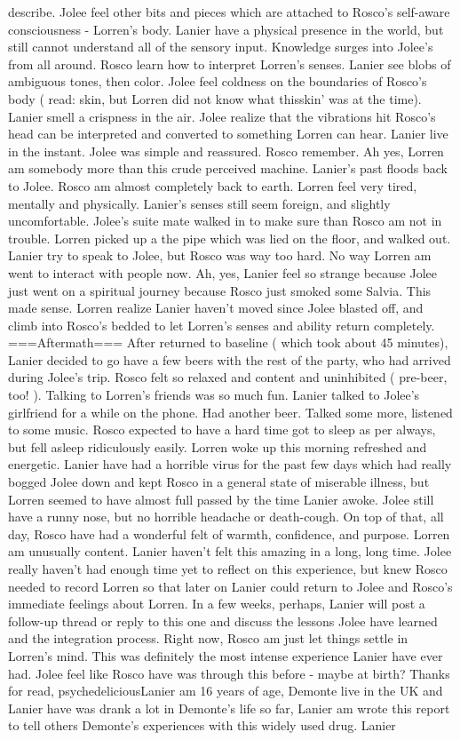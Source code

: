 \documentclass[12pt]{book}
\begin{document}
describe. Jolee feel other bits and pieces which are attached to Rosco's self-aware consciousness - Lorren's body. Lanier have a physical presence in the world, but still cannot understand all of the sensory input. Knowledge surges into Jolee's from all around. Rosco learn how to interpret Lorren's senses. Lanier see blobs of ambiguous tones, then color. Jolee feel coldness on the boundaries of Rosco's body ( read: skin, but Lorren did not know what thisskin' was at the time). Lanier smell a crispness in the air. Jolee realize that the vibrations hit Rosco's head can be interpreted and converted to something Lorren can hear. Lanier live in the instant. Jolee was simple and reassured. Rosco remember. Ah yes, Lorren am somebody more than this crude perceived machine. Lanier's past floods back to Jolee. Rosco am almost completely back to earth. Lorren feel very tired, mentally and physically. Lanier's senses still seem foreign, and slightly uncomfortable. Jolee's suite mate walked in to make sure than Rosco am not in trouble. Lorren picked up a the pipe which was lied on the floor, and walked out. Lanier try to speak to Jolee, but Rosco was way too hard. No way Lorren am went to interact with people now. Ah, yes, Lanier feel so strange because Jolee just went on a spiritual journey because Rosco just smoked some Salvia. This made sense. Lorren realize Lanier haven't moved since Jolee blasted off, and climb into Rosco's bedded to let Lorren's senses and ability return completely. ===Aftermath=== After returned to baseline ( which took about 45 minutes), Lanier decided to go have a few beers with the rest of the party, who had arrived during Jolee's trip. Rosco felt so relaxed and content and uninhibited ( pre-beer, too! ). Talking to Lorren's friends was so much fun. Lanier talked to Jolee's girlfriend for a while on the phone. Had another beer. Talked some more, listened to some music. Rosco expected to have a hard time got to sleep as per always, but fell asleep ridiculously easily. Lorren woke up this morning refreshed and energetic. Lanier have had a horrible virus for the past few days which had really bogged Jolee down and kept Rosco in a general state of miserable illness, but Lorren seemed to have almost full passed by the time Lanier awoke. Jolee still have a runny nose, but no horrible headache or death-cough. On top of that, all day, Rosco have had a wonderful felt of warmth, confidence, and purpose. Lorren am unusually content. Lanier haven't felt this amazing in a long, long time. Jolee really haven't had enough time yet to reflect on this experience, but knew Rosco needed to record Lorren so that later on Lanier could return to Jolee and Rosco's immediate feelings about Lorren. In a few weeks, perhaps, Lanier will post a follow-up thread or reply to this one and discuss the lessons Jolee have learned and the integration process. Right now, Rosco am just let things settle in Lorren's mind. This was definitely the most intense experience Lanier have ever had. Jolee feel like Rosco have was through this before - maybe at birth? Thanks for read, psychedeliciousLanier am 16 years of age, Demonte live in the UK and Lanier have was drank a lot in Demonte's life so far, Lanier am wrote this report to tell others Demonte's experiences with this widely used drug. Lanier 
\end{document}

